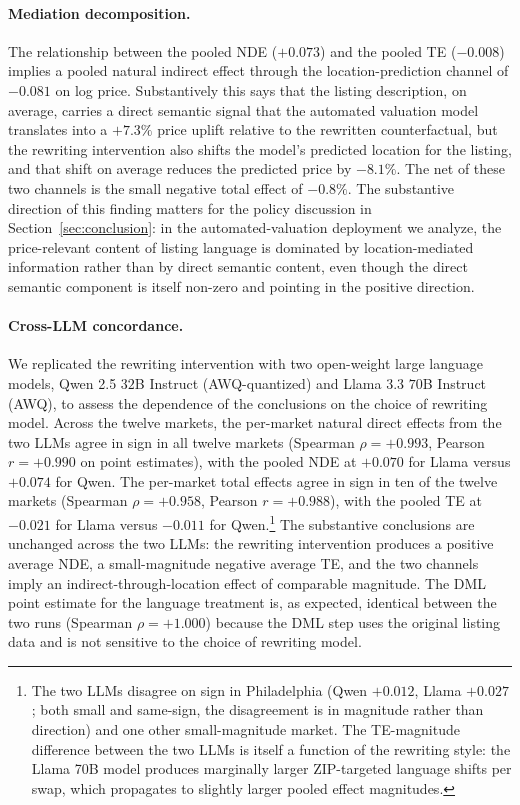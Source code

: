 \paragraph{Mediation decomposition.} The relationship between the
pooled NDE ($+0.073$) and the pooled TE ($-0.008$) implies a pooled
natural indirect effect through the location-prediction channel of
$-0.081$ on log price. Substantively this says that the listing
description, on average, carries a direct semantic signal that the
automated valuation model translates into a $+7.3\%$ price uplift
relative to the rewritten counterfactual, but the rewriting
intervention also shifts the model's predicted location for the
listing, and that shift on average reduces the predicted price by
$-8.1\%$. The net of these two channels is the small negative total
effect of $-0.8\%$. The substantive direction of this finding
matters for the policy discussion in Section~\ref{sec:conclusion}: in
the automated-valuation deployment we analyze, the price-relevant
content of listing language is dominated by location-mediated
information rather than by direct semantic content, even though the
direct semantic component is itself non-zero and pointing in the
positive direction.

\paragraph{Cross-LLM concordance.} We replicated the rewriting
intervention with two open-weight large language models, Qwen 2.5
$32$B Instruct (AWQ-quantized) and Llama 3.3 $70$B Instruct (AWQ),
to assess the dependence of the conclusions on the choice of
rewriting model. Across the twelve markets, the per-market natural
direct effects from the two LLMs agree in sign in all twelve markets
(Spearman $\rho = +0.993$, Pearson $r = +0.990$ on point estimates),
with the pooled NDE at $+0.070$ for Llama versus $+0.074$ for Qwen.
The per-market total effects agree in sign in ten of the twelve
markets (Spearman $\rho = +0.958$, Pearson $r = +0.988$), with the
pooled TE at $-0.021$ for Llama versus $-0.011$ for Qwen.\footnote{The
two LLMs disagree on sign in Philadelphia (Qwen $+0.012$, Llama
$+0.027$; both small and same-sign, the disagreement is in magnitude
rather than direction) and one other small-magnitude market. The
TE-magnitude difference between the two LLMs is itself a function of
the rewriting style: the Llama 70B model produces marginally larger
ZIP-targeted language shifts per swap, which propagates to slightly
larger pooled effect magnitudes.} The substantive conclusions are
unchanged across the two LLMs: the rewriting intervention produces a
positive average NDE, a small-magnitude negative average TE, and the
two channels imply an indirect-through-location effect of comparable
magnitude. The DML point estimate for the language treatment is, as
expected, identical between the two runs (Spearman $\rho = +1.000$)
because the DML step uses the original listing data and is not
sensitive to the choice of rewriting model.
